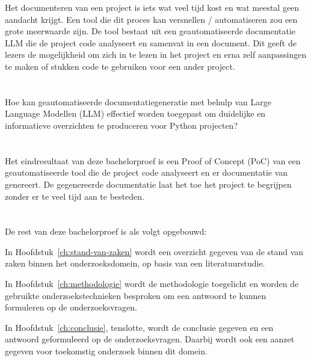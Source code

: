 Het documenteren van een project is iets wat veel tijd kost en wat meestal geen aandacht krijgt.
Een tool die dit proces kan versnellen / automatiseren zou een grote meerwaarde zijn.
De tool bestaat uit een geautomatiseerde documentatie LLM die de project code analyseert en samenvat in een document. 
Dit geeft de lezers de mogelijkheid om zich in te lezen in het project en erna zelf aanpassingen te maken of stukken code te gebruiken voor een ander project.

\section{}%
\label{sec:onderzoeksvraag}

Hoe kan geautomatiseerde documentatiegeneratie met behulp van Large Language Modellen (LLM) effectief worden toegepast om duidelijke en informatieve overzichten te produceren voor Python projecten?

\section{}%
\label{sec:onderzoeksdoelstelling}

Het eindresultaat van deze bachelorproef is een Proof of Concept (PoC) van een geautomatiseerde tool die de project code analyseert en er documentatie van genereert.
De gegenereerde documentatie laat het toe het project te begrijpen zonder er te veel tijd aan te besteden.

\section{}%
\label{sec:opzet-bachelorproef}


De rest van deze bachelorproef is als volgt opgebouwd:

In Hoofdstuk~\ref{ch:stand-van-zaken} wordt een overzicht gegeven van de stand van zaken binnen het onderzoeksdomein, op basis van een literatuurstudie.

In Hoofdstuk~\ref{ch:methodologie} wordt de methodologie toegelicht en worden de gebruikte onderzoekstechnieken besproken om een antwoord te kunnen formuleren op de onderzoeksvragen.


In Hoofdstuk~\ref{ch:conclusie}, tenslotte, wordt de conclusie gegeven en een antwoord geformuleerd op de onderzoeksvragen. Daarbij wordt ook een aanzet gegeven voor toekomstig onderzoek binnen dit domein.